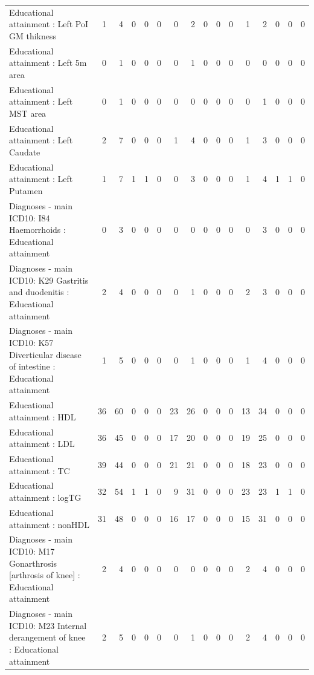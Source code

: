 \begin{table}[ht]
\begin{tabular}{lrrrrrrrrrrrrrrr}
  Educational attainment : Left PoI GM thikness &   1 &   4 &   0 &   0 &   0 &   0 &   2 &   0 &   0 &   0 &   1 &   2 &   0 &   0 &   0 \\ 
  Educational attainment : Left 5m area &   0 &   1 &   0 &   0 &   0 &   0 &   1 &   0 &   0 &   0 &   0 &   0 &   0 &   0 &   0 \\ 
  Educational attainment : Left MST area &   0 &   1 &   0 &   0 &   0 &   0 &   0 &   0 &   0 &   0 &   0 &   1 &   0 &   0 &   0 \\ 
  Educational attainment : Left Caudate &   2 &   7 &   0 &   0 &   0 &   1 &   4 &   0 &   0 &   0 &   1 &   3 &   0 &   0 &   0 \\ 
  Educational attainment : Left Putamen &   1 &   7 &   1 &   1 &   0 &   0 &   3 &   0 &   0 &   0 &   1 &   4 &   1 &   1 &   0 \\ 
  Diagnoses - main ICD10: I84 Haemorrhoids : Educational attainment &   0 &   3 &   0 &   0 &   0 &   0 &   0 &   0 &   0 &   0 &   0 &   3 &   0 &   0 &   0 \\ 
  Diagnoses - main ICD10: K29 Gastritis and duodenitis : Educational attainment &   2 &   4 &   0 &   0 &   0 &   0 &   1 &   0 &   0 &   0 &   2 &   3 &   0 &   0 &   0 \\ 
  Diagnoses - main ICD10: K57 Diverticular disease of intestine : Educational attainment &   1 &   5 &   0 &   0 &   0 &   0 &   1 &   0 &   0 &   0 &   1 &   4 &   0 &   0 &   0 \\ 
  Educational attainment : HDL &  36 &  60 &   0 &   0 &   0 &  23 &  26 &   0 &   0 &   0 &  13 &  34 &   0 &   0 &   0 \\ 
  Educational attainment : LDL &  36 &  45 &   0 &   0 &   0 &  17 &  20 &   0 &   0 &   0 &  19 &  25 &   0 &   0 &   0 \\ 
  Educational attainment : TC &  39 &  44 &   0 &   0 &   0 &  21 &  21 &   0 &   0 &   0 &  18 &  23 &   0 &   0 &   0 \\ 
  Educational attainment : logTG &  32 &  54 &   1 &   1 &   0 &   9 &  31 &   0 &   0 &   0 &  23 &  23 &   1 &   1 &   0 \\ 
  Educational attainment : nonHDL &  31 &  48 &   0 &   0 &   0 &  16 &  17 &   0 &   0 &   0 &  15 &  31 &   0 &   0 &   0 \\ 
  Diagnoses - main ICD10: M17 Gonarthrosis [arthrosis of knee] : Educational attainment &   2 &   4 &   0 &   0 &   0 &   0 &   0 &   0 &   0 &   0 &   2 &   4 &   0 &   0 &   0 \\ 
  Diagnoses - main ICD10: M23 Internal derangement of knee : Educational attainment &   2 &   5 &   0 &   0 &   0 &   0 &   1 &   0 &   0 &   0 &   2 &   4 &   0 &   0 &   0 \\ 

\end{tabular}
\end{table}

